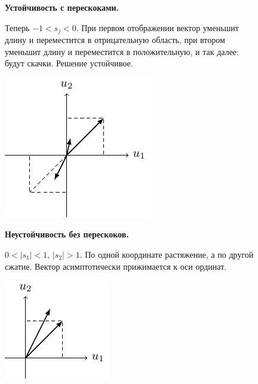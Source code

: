 \begin{figure}[H]
	\centering
	\begin{minipage}{0.65\linewidth}
		\textbf{Устойчивость с перескоками. }

		Теперь $-1<s_j<0$. При первом отображении вектор уменьшит длину и переместится в отрицательную область, при втором уменьшит длину и
		переместится в положительную, и так далее: будут скачки. Решение устойчивое.
	\end{minipage}
	\begin{minipage}{0.34\linewidth}
		\centering
		\includegraphics[scale=1.5]{img/parametric_oscillations/sj_2}
	\end{minipage}		
\end{figure}

\begin{figure}[H]
	\centering
	\begin{minipage}{0.65\linewidth}
		\textbf{Неустойчивость без перескоков. }

		$0<|s_1|<1$, $|s_2|>1$. По одной координате растяжение, а по другой сжатие. Вектор асимптотически прижимается к
		оси ординат.
	\end{minipage}
	\begin{minipage}{0.34\linewidth}
		\centering
		\includegraphics[scale=1.5]{img/parametric_oscillations/sj_3}   
	\end{minipage}		
\end{figure}

